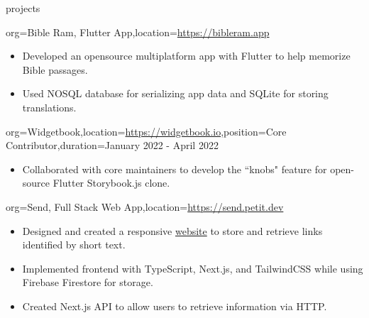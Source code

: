 \documentclass{resume}
\begin{document}
\begin{ResumeSection}{projects}
    \begin{ResumeProject}{org={Bible Ram, Flutter
        App},location={\href{https://bibleram.app}{https://bibleram.app}}}
        \begin{itemize}
            \item {Developed an opensource multiplatform app with Flutter to
                help memorize Bible passages.} 
            \item {Used NOSQL database for serializing app data and SQLite for
                storing translations.}
        \end{itemize}
    \end{ResumeProject}
    \begin{ResumeProject}{org={Widgetbook},location={\href{https://www.widgetbook.io/}{https://widgetbook.io}},position={Core Contributor},duration={January 2022 - April 2022}}
        \begin{itemize}
            \item Collaborated with core maintainers to develop the ``knobs"
                feature for open-source Flutter Storybook.js clone.
        \end{itemize}
    \end{ResumeProject}
    \begin{ResumeProject}{org={Send, Full Stack Web App},location={\href{https://send.petit.dev}{https://send.petit.dev}}}
        \begin{itemize}
            \item {Designed and created a responsive \href{https://send.petit.dev}{website} to store and retrieve links identified by short text.}
            \item {Implemented frontend with TypeScript, Next.js, and
                TailwindCSS while using Firebase Firestore for storage.}
            \item {Created Next.js API to allow users to retrieve
                information via HTTP.}
        \end{itemize}
    \end{ResumeProject}
\end{ResumeSection}
\end{document}
